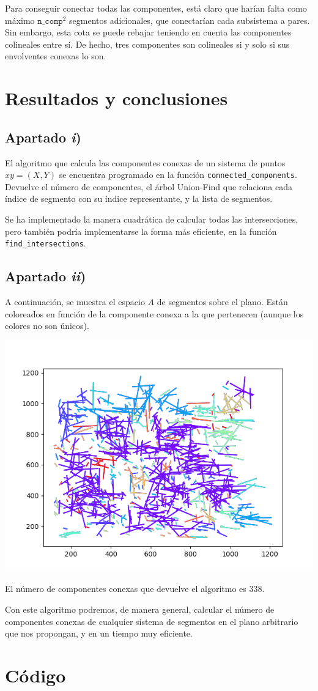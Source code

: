 \documentclass[a4paper]{article}
\begin{document}
	Para conseguir conectar todas las componentes, está claro que harían falta como máximo $\texttt{n\_comp}^2$ segmentos adicionales, que conectarían cada subsistema a pares. Sin embargo, esta cota se puede rebajar teniendo en cuenta las componentes colineales entre sí. De hecho, tres componentes son colineales si y solo si sus envolventes conexas lo son.
	
	\section{Resultados y conclusiones}
	\subsection{Apartado \textit{i})}
	El algoritmo que calcula las componentes conexas de un sistema de puntos $xy=(X,Y)$ se encuentra programado en la función \texttt{connected\_components}. Devuelve el número de componentes, el árbol Union-Find que relaciona cada índice de segmento con su índice representante, y la lista de segmentos. 
	
	Se ha implementado la manera cuadrática de calcular todas las intersecciones, pero también podría implementarse la forma más eficiente, en la función \texttt{find\_intersections}.
	
	\subsection{Apartado \textit{ii})}
	A continuación, se muestra el espacio $A$ de segmentos sobre el plano. Están coloreados en función de la componente conexa a la que pertenecen (aunque los colores no son únicos). 
	
\begin{center}
		\includegraphics[width=0.7\linewidth]{2}
\end{center}
	
	El número de componentes conexas que devuelve el algoritmo es 338.
	
	Con este algoritmo podremos, de manera general, calcular el número de componentes conexas de cualquier sistema de segmentos en el plano arbitrario que nos propongan, y en un tiempo muy eficiente.
	
	
	\newpage
	\section{Código}\label{codigo}
	
	
	
\end{document}
